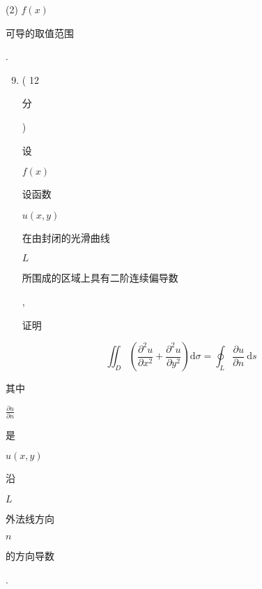 \documentclass[10pt]{article}
\begin{document}
(2) $f(x)$ \begin{CJK}{UTF8}{mj}可导的取值范围\end{CJK}.

\begin{enumerate}
  \setcounter{enumi}{8}
  \item ( 12 \begin{CJK}{UTF8}{mj}分\end{CJK}) \begin{CJK}{UTF8}{mj}设\end{CJK} $f(x)$ \begin{CJK}{UTF8}{mj}设函数\end{CJK} $u(x, y)$ \begin{CJK}{UTF8}{mj}在由封闭的光滑曲线\end{CJK} $L$ \begin{CJK}{UTF8}{mj}所围成的区域上具有二阶连续偏导数\end{CJK}, \begin{CJK}{UTF8}{mj}证明\end{CJK}
\end{enumerate}
$$
\iint_{D}\left(\frac{\partial^{2} u}{\partial x^{2}}+\frac{\partial^{2} u}{\partial y^{2}}\right) \mathrm{d} \sigma=\oint_{L} \frac{\partial u}{\partial n} \mathrm{~d} s
$$
\begin{CJK}{UTF8}{mj}其中\end{CJK} $\frac{\partial u}{\partial n}$ \begin{CJK}{UTF8}{mj}是\end{CJK} $u(x, y)$ \begin{CJK}{UTF8}{mj}沿\end{CJK} $L$ \begin{CJK}{UTF8}{mj}外法线方向\end{CJK} $n$ \begin{CJK}{UTF8}{mj}的方向导数\end{CJK}.
\end{document}
